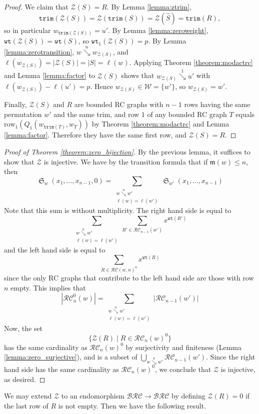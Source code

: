 \documentclass{amsart}
\theoremstyle{definition}
\theoremstyle{remark}
\numberwithin{equation}{subsection}
\DeclareMathOperator{\sch}{\mathfrak{S}}
\newcommand{\downvar}[1]{\stackrel{#1}{\searrow}}
\newcommand{\wof}[1]{w_{#1}}
\newcommand{\wtt}{\mathtt{wt}}
\newcommand{\trm}{\mathtt{trim}}
\newcommand{\zeromap}{\mathcal{Z}}
\newcommand{\BRC}{\mathcal{BRC}}
\newcommand{\RC}{\mathcal{RC}}
\newcommand{\maxd}{\mathfrak{m}}
\begin{document}
\begin{proof}
  We claim that $\zeromap(S)=R$. By Lemma \ref{lemma:ztrim},
  $$\trm(\zeromap(S))=\zeromap(\trm(S))=\zeromap(\widehat S)=\trm(R),$$
  so in particular $\wof{\trm(\zeromap(S))}=u'$. By Lemma \ref{lemma:zeroweight}, $\wtt(\zeromap(S))=\wtt(S)$, so $\wtt_1(\zeromap(S))=p$. By Lemma \ref{lemma:zerotransition}, $w\downvar{n}\wof{\zeromap(S)}$, and $\ell(\wof{\zeromap(S)})=|\zeromap(S)|=|S|=\ell(w)$. Applying Theorem \ref{theorem:modactrc} and Lemma \ref{lemma:factor} to $\zeromap(S)$ shows that $\wof{\zeromap(S)}\downvar{1}u'$ with $\ell(\wof{\zeromap(S)})-\ell(u')=p$. Hence $\wof{\zeromap(S)}\in\mathcal{W}=\{w'\}$, so $\wof{\zeromap(S)}=w'$.

  Finally, $\zeromap(S)$ and $R$ are bounded RC graphs with $n-1$ rows having the same permutation $w'$ and the same trim, and row $1$ of any bounded RC graph $T$ equals $\mathrm{row}_1(Q_1(\wof{\trm(T)},\wof T))$ by Theorem \ref{theorem:modactrc} and Lemma \ref{lemma:factor}. Therefore they have the same first row, and $\zeromap(S)=R$.
\end{proof}

\begin{proof}[Proof of Theorem \ref{theorem:zero_bijection}]
By the previous lemma, it suffices to show that $\zeromap$ is injective. We have by the transition formula that if $\maxd(w)\leq n$, then
$$\sch_w(x_1,\ldots,x_{n-1},0) = \sum_{\substack{w\downvar{n} w'\\\ell(w)=\ell(w')}}\sch_{w'}(x_1,\ldots,x_{n-1})$$
Note that this sum is without multiplicity. The right hand side is equal to
$$\sum_{\substack{w\downvar{n} w'\\\ell(w)=\ell(w')}}\sum_{R'\in \RC_{n-1}(w')}x^{\wtt(R')}$$
and the left hand side is equal to
$$\sum_{R\in \mathcal{RC}(w, n)^0}x^{\wtt(R)}$$
since the only RC graphs that contribute to the left hand side are those with row $n$ empty. This implies that
$$|\RC_n^0(w)| = \sum_{\substack{w\downvar{n} w'\\\ell(w)=\ell(w')}}|\RC_{n-1}(w')|$$
Now, the set 
$$\{\zeromap(R) \mid R\in \mathcal{RC}_n(w)^0\}$$
has the same cardinality as $\mathcal{RC}_n(w)^0$ by surjectivity and finiteness (Lemma \ref{lemma:zero_surjective}), and is a subset of $\bigcup_{w\downvar{n} w'}\mathcal{RC}_{n-1}(w')$. Since the right hand side has the same cardinality as $\mathcal{RC}_n(w)^0$, we conclude that $\zeromap$ is injective, as desired.
\end{proof}


We may extend $\zeromap$ to an endomorphism $\BRC\to\BRC$ by defining $\zeromap(R) = 0$ if the last row of $R$ is not empty. Then we have the following result.
\end{document}
